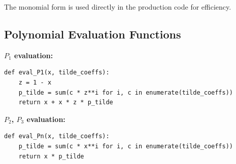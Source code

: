 \documentclass[11pt]{article}
\begin{document}
The monomial form is used directly in the production code for efficiency.

\subsection{Polynomial Evaluation Functions}

\textbf{$P_1$ evaluation:}
\begin{verbatim}
def eval_P1(x, tilde_coeffs):
    z = 1 - x
    p_tilde = sum(c * z**i for i, c in enumerate(tilde_coeffs))
    return x + x * z * p_tilde
\end{verbatim}

\textbf{$P_2$, $P_3$ evaluation:}
\begin{verbatim}
def eval_Pn(x, tilde_coeffs):
    p_tilde = sum(c * x**i for i, c in enumerate(tilde_coeffs))
    return x * p_tilde
\end{verbatim}
\end{document}

